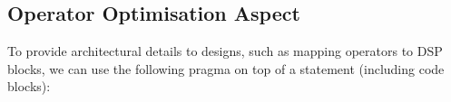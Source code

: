\begin{comment}
\lstset{style=lara}
\begin{figure}[!h]
\begin{lstlisting}
aspectdef AspReconfig
input
   partition
end
select function.call end
apply
   if ($call.key in partition) {
      var cfg = partition[$call.key].cfg;
      var hw = partition[$call.key].hw;
      $call.insert before %{
         #pragma FAST hw:[[hw]] cfg:[[cfg]]
      }%;
   }
end
end
\end{lstlisting}
\caption{Reconfiguration aspect.}
\label{fig:aspect-reconf}
\end{figure}

Table \ref{fig:aspect-hash} shows an example of a hash table
representing a hardware partition. The key (e.g. main:f:1) identifies
a function call in the application, and is formed by concatenating the
name of the caller function (main), the name of the invoked function
(e.g. f) and a unique number (1).  Line~5 in the aspect shown in
Fig.~\ref{fig:aspect-reconf} selects all function calls, and for each
call found in the input partition (line~7), we set the appropriate
pragma on top of the call statement (lines 10--12). We can now realize
and experiment different reconfiguration designs by invoking this
aspect with different hardware partitions.


\begin{table}[!h]
\caption{An example of a hardware partition, represented as a hash
  table, used with the reconfiguration aspect
  (Fig.~\ref{fig:aspect-reconf})}
\label{fig:aspect-hash}
\centering
\begin{tabular}{c|c|c}
\hline
\multicolumn{3}{c}{\bf{partition}} \\
\hline
\bf{\$call.key} & \bf{hw} & \bf{cfg}  \\
\hline
main:f:1 & fast\_f0 & c0 \\
main:f:2 & fast\_f1 & c1 \\
main:g:3 & fast\_g & c1 \\
\hline
\end{tabular}
\end{table}

\end{comment}

\subsection{Operator Optimisation Aspect}
\label{sect:asp_ops}
To provide architectural details to \MAXC{} designs, such as mapping
operators to DSP blocks, we can use the following \MAXC{} pragma on
top of a statement (including code blocks):
\vspace{2mm}

